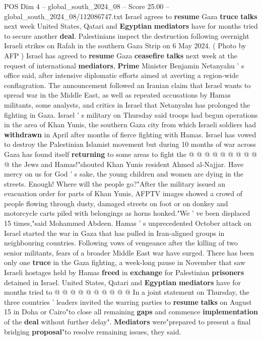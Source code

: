 \begin{textsample}{POS Dim 4 – global\_south\_2024\_08 – Score 25.00 – global\_south\_2024\_08/112086747.txt}  \label{ex:f4_pos_122}
Israel agrees to \textbf{resume} Gaza \textbf{truce} \textbf{talks} next week United States, Qatari and \textbf{Egyptian} \textbf{mediators} have for months tried to secure another \textbf{deal}.
Palestinians inspect the destruction following overnight Israeli strikes on Rafah in the southern Gaza Strip on 6 May 2024. ( Photo by AFP ) Israel has agreed to \textbf{resume} Gaza \textbf{ceasefire} \textbf{talks} next week at the request of international \textbf{mediators}, \textbf{Prime} Minister Benjamin Netanyahu ' s office said, after intensive diplomatic efforts aimed at averting a region-wide conflagration.
The announcement followed an Iranian claim that Israel wants to spread war in the Middle East, as well as repeated accusations by Hamas militants, some analysts, and critics in Israel that Netanyahu has prolonged the fighting in Gaza.
Israel ' s military on Thursday said troops had begun operations in the area of Khan Yunis, the southern Gaza city from which Israeli soldiers had \textbf{withdrawn} in April after months of fierce fighting with Hamas.
Israel has vowed to destroy the Palestinian Islamist movement but during 10 months of war across Gaza has found itself \textbf{returning} to some areas to fight the @ @ @ @ @ @ @ @ @ @ the Jews and Hamas!"shouted Khan Yunis resident Ahmed al-Najjar.
Have mercy on us for God ' s sake, the young children and women are dying in the streets.
Enough!
Where will the people go?"After the military issued an evacuation order for parts of Khan Yunis, AFPTV images showed a crowd of people flowing through dusty, damaged streets on foot or on donkey and motorcycle carts piled with belongings as horns honked."We ' ve been displaced 15 times,"said Mohammed Abdeen.
Hamas ' s unprecedented October attack on Israel started the war in Gaza that has pulled in Iran-aligned groups in neighbouring countries.
Following vows of vengeance after the killing of two senior militants, fears of a broader Middle East war have surged.
There has been only one \textbf{truce} in the Gaza fighting, a week-long pause in November that saw Israeli hostages held by Hamas \textbf{freed} in \textbf{exchange} for Palestinian \textbf{prisoners} detained in Israel.
United States, Qatari and \textbf{Egyptian} \textbf{mediators} have for months tried to @ @ @ @ @ @ @ @ @ @ In a joint statement on Thursday, the three countries ' leaders invited the warring parties to \textbf{resume} \textbf{talks} on August 15 in Doha or Cairo"to close all remaining \textbf{gaps} and commence \textbf{implementation} of the \textbf{deal} without further delay". \textbf{Mediators} were"prepared to present a final bridging \textbf{proposal}"to resolve remaining issues, they said.

\end{textsample}
